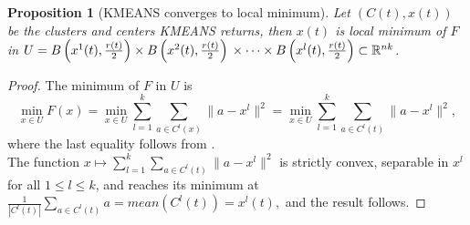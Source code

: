\documentclass[11pt]{article}
\numberwithin{equation}{section}
\newtheorem{proposition}{Proposition}[section]
\begin{document}
\begin{proposition}[KMEANS converges to local minimum]
Let $(C(t), x(t))$ be the clusters and centers KMEANS returns, then $x(t)$ is local minimum of $F$ in $U = B\left( x^1(t),\frac{r(t)}{2}\right) \times  B\left( x^2(t),\frac{r(t)}{2}\right) \\ \times \cdots \times B\left( x^l(t),\frac{r(t)}{2} \right) \subset \mathbb{R}^{nk}$.
\end{proposition}

\begin{proof}
The minimum of $F$ in $U$ is
\begin{equation*}
\min\limits_{x \in U} F(x) = \min\limits_{x \in U} \sum\limits_{l=1}^{k} \sum\limits_{a \in C^l(x)} \|a - x^l \|^2 = \min\limits_{x \in U} \sum\limits_{l=1}^{k} \sum\limits_{a \in C^l(t)} \|a - x^l \|^2 ,
\end{equation*}
where the last equality follows from .\\
The function $x \mapsto \sum\limits_{l=1}^{k} \sum\limits_{a \in C^l(t)} \|a - x^l \|^2$ is strictly convex, separable in $x^l$ for all $1 \leq l \leq k$, and reaches its minimum at $\frac{1}{\left| C^l(t) \right|} \sum\limits_{a \in C^l(t)} a = mean(C^l(t)) = x^l(t),$ and the result follows.
\end{proof}
\end{document}
